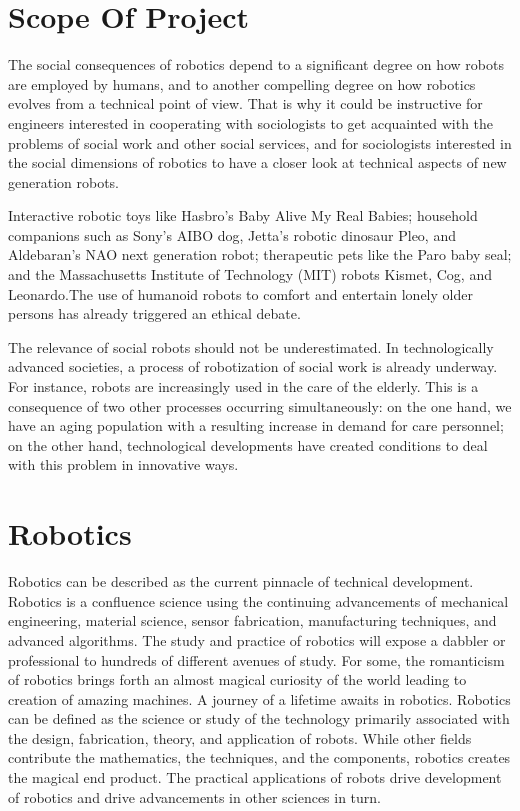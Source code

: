 \documentclass{fisatproject}
\begin{document}
\section{Scope Of Project}
The social consequences of robotics depend to a significant degree on how robots are employed by humans, and to another compelling degree on how robotics evolves from a technical point of view.\cite{a} That is why it could be instructive for engineers interested in cooperating with sociologists to get acquainted with the problems of social work and other social services, and for sociologists interested in the social dimensions of robotics to have a closer look at technical aspects of new generation robots.\cite{b}\newline\newline
\par
Interactive robotic toys like Hasbro’s Baby Alive My Real Babies; household companions such as Sony’s AIBO dog, Jetta’s robotic dinosaur Pleo, and Aldebaran’s NAO next generation robot; therapeutic pets like the Paro baby seal; and the Massachusetts Institute of Technology (MIT) robots Kismet, Cog, and Leonardo.\cite{c}The use of humanoid robots to comfort and entertain lonely older persons has already triggered an ethical debate.\cite{e}\newline\newline
\par
The relevance of social robots should not be underestimated. In technologically advanced societies, a process of robotization of social work is already underway.\cite{h} For instance, robots are increasingly used in the care of the elderly. This is a consequence of two other processes occurring simultaneously: on the one hand, we have an aging population with a resulting increase in demand for care personnel; on the other hand, technological developments have created conditions to deal with this problem in innovative ways.

\section{Robotics}
Robotics can be described as the current pinnacle of technical development. Robotics is a confluence science using the continuing advancements of mechanical engineering, material science, sensor fabrication, manufacturing techniques, and advanced algorithms. The study and practice of robotics will expose a dabbler or professional to hundreds of different avenues of study. For some, the romanticism of robotics brings forth an almost magical curiosity of the world leading to creation of amazing machines. A journey of a lifetime awaits in robotics.\cite{f,g}\newline\newline
Robotics can be defined as the science or study of the technology primarily associated with the design, fabrication, theory, and application of robots. While other fields contribute the mathematics, the techniques, and the components, robotics creates the magical end product. The practical applications of robots drive development of robotics and drive advancements in other sciences in turn.
\end{document}
